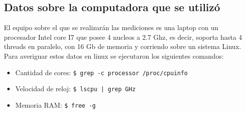 \subsection{Datos sobre la computadora que se utilizó}
    El equipo sobre el que se realizarán las mediciones es una laptop con un
    procesador Intel core I7 que posee 4 nucleos a 2.7 Ghz, es decir, soporta
    hasta 4 threads en paralelo, con 16 Gb de memoria y corriendo sobre un
    sistema Linux.\\
    Para averiguar estos datos en linux se ejecutaron los siguientes comandos:\\
    \begin{itemize}
        \item Cantidad de cores: \lstinline[columns=fixed]{$ grep -c processor /proc/cpuinfo}
        \item Velocidad de reloj: \lstinline[columns=fixed]{$ lscpu | grep GHz}
        \item Memoria RAM: \lstinline[columns=fixed]{$ free -g}
    \end{itemize}
